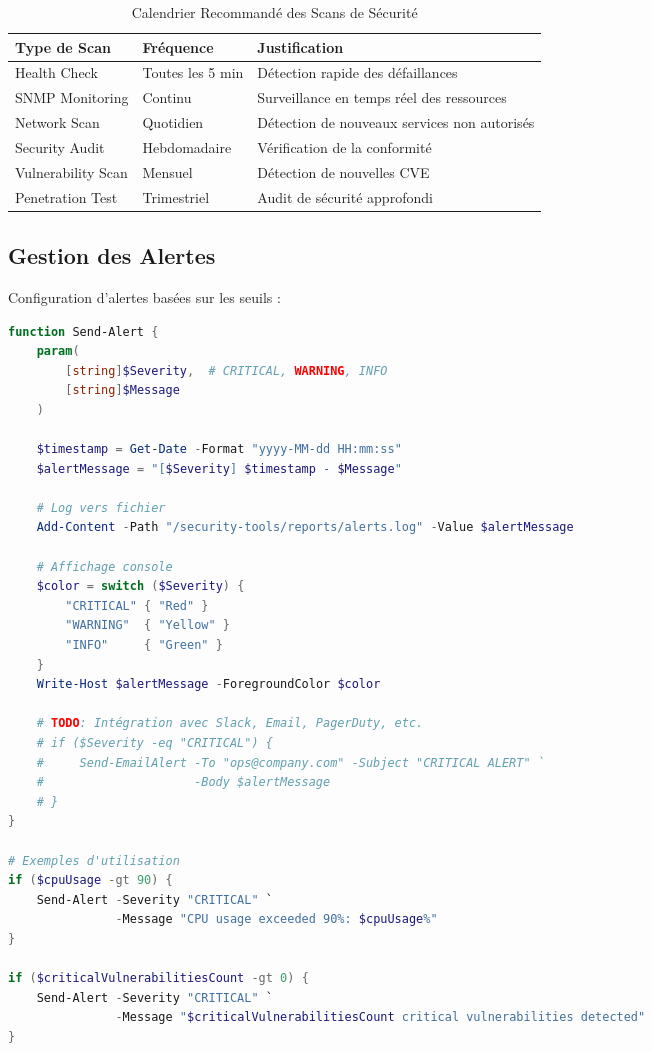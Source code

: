 \begin{table}[H]
\centering
\caption{Calendrier Recommandé des Scans de Sécurité}
\label{tab:scan_schedule}
\begin{tabular}{|l|l|p{6cm}|}
\hline
\textbf{Type de Scan} & \textbf{Fréquence} & \textbf{Justification} \\
\hline
Health Check & Toutes les 5 min & Détection rapide des défaillances \\
\hline
SNMP Monitoring & Continu & Surveillance en temps réel des ressources \\
\hline
Network Scan & Quotidien & Détection de nouveaux services non autorisés \\
\hline
Security Audit & Hebdomadaire & Vérification de la conformité \\
\hline
Vulnerability Scan & Mensuel & Détection de nouvelles CVE \\
\hline
Penetration Test & Trimestriel & Audit de sécurité approfondi \\
\hline
\end{tabular}
\end{table}

\subsection{Gestion des Alertes}

Configuration d'alertes basées sur les seuils :

\begin{lstlisting}[language=PowerShell, caption=Système d'Alerting Simplifié]
function Send-Alert {
    param(
        [string]$Severity,  # CRITICAL, WARNING, INFO
        [string]$Message
    )
    
    $timestamp = Get-Date -Format "yyyy-MM-dd HH:mm:ss"
    $alertMessage = "[$Severity] $timestamp - $Message"
    
    # Log vers fichier
    Add-Content -Path "/security-tools/reports/alerts.log" -Value $alertMessage
    
    # Affichage console
    $color = switch ($Severity) {
        "CRITICAL" { "Red" }
        "WARNING"  { "Yellow" }
        "INFO"     { "Green" }
    }
    Write-Host $alertMessage -ForegroundColor $color
    
    # TODO: Intégration avec Slack, Email, PagerDuty, etc.
    # if ($Severity -eq "CRITICAL") {
    #     Send-EmailAlert -To "ops@company.com" -Subject "CRITICAL ALERT" `
    #                     -Body $alertMessage
    # }
}

# Exemples d'utilisation
if ($cpuUsage -gt 90) {
    Send-Alert -Severity "CRITICAL" `
               -Message "CPU usage exceeded 90%: $cpuUsage%"
}

if ($criticalVulnerabilitiesCount -gt 0) {
    Send-Alert -Severity "CRITICAL" `
               -Message "$criticalVulnerabilitiesCount critical vulnerabilities detected"
}
\end{lstlisting}

